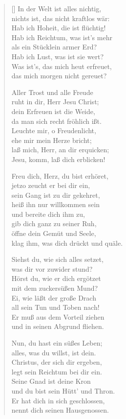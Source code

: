 \begin{multicols}{2}
\begin{verse}[\versewidth]
   In der Welt ist alles nichtig,\\
  nichts ist, das nicht kraftlos wär:\\
  Hab ich Hoheit, die ist flüchtig!\\
  Hab ich Reichtum, was ist's mehr\\
  als ein Stücklein armer Erd?\\
  Hab ich Lust, was ist sie wert?\\
  Was ist's, das mich heut erfreuet,\\
  das mich morgen nicht gereuet?

   Aller Trost und alle Freude\\
  ruht in dir, Herr Jesu Christ;\\
  dein Erfreuen ist die Weide,\\
  da man sich recht fröhlich ißt.\\
  Leuchte mir, o Freudenlicht,\\
  ehe mir mein Herze bricht;\\
  laß mich, Herr, an dir erquicken;\\
  Jesu, komm, laß dich erblicken!

   Freu dich, Herz, du bist erhöret,\\
  jetzo zeucht er bei dir ein,\\
  sein Gang ist zu dir gekehret,\\
  heiß ihn nur willkommen sein\\
  und bereite dich ihm zu,\\
  gib dich ganz zu seiner Ruh,\\
  öffne dein Gemüt und Seele,\\
  klag ihm, was dich drückt und quäle.

   Siehst du, wie sich alles setzet,\\
  was dir vor zuwider stund?\\
  Hörst du, wie er dich ergötzet\\
  mit dem zuckersüßen Mund?\\
  Ei, wie läßt der große Drach\\
  all sein Tun und Toben nach!\\
  Er muß aus dem Vorteil ziehen\\
  und in seinen Abgrund fliehen.

   Nun, du hast ein süßes Leben;\\
  alles, was du willst, ist dein.\\
  Christus, der sich dir ergeben,\\
  legt sein Reichtum bei dir ein.\\
  Seine Gnad ist deine Kron\\
  und du bist sein Hütt' und Thron.\\
  Er hat dich in sich geschlossen,\\
  nennt dich seinen Hausgenossen.


\end{verse}
\end{multicols}
